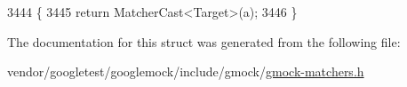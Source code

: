 \begin{DoxyCode}
3444                                                  \{
3445     \textcolor{keywordflow}{return} MatcherCast<Target>(a);
3446   \}
\end{DoxyCode}


The documentation for this struct was generated from the following file\+:\begin{DoxyCompactItemize}
\item 
vendor/googletest/googlemock/include/gmock/\hyperlink{gmock-matchers_8h}{gmock-\/matchers.\+h}\end{DoxyCompactItemize}
